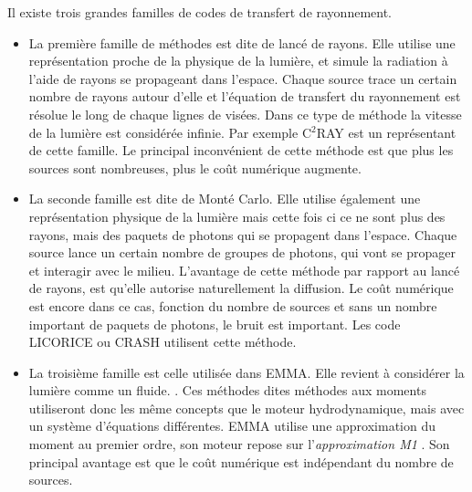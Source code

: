 Il existe trois grandes familles de codes de transfert de rayonnement.
\begin{itemize}

\item La première famille de méthodes est dite de lancé de rayons.
Elle utilise une représentation proche de la physique de la lumière, et simule la radiation à l'aide de rayons se propageant dans l'espace.
Chaque source trace un certain nombre de rayons autour d'elle et l'équation de transfert du rayonnement est résolue le long de chaque lignes de visées.
Dans ce type de méthode la vitesse de la lumière est considérée infinie.
Par exemple C$^2$RAY \citep{2006NewA...11..374M} est un représentant de cette famille.
Le principal inconvénient de cette méthode est que plus les sources sont nombreuses, plus le coût numérique augmente.

\item La seconde famille est dite de Monté Carlo.
Elle utilise également une représentation physique de la lumière mais cette fois ci ce ne sont plus des rayons, mais des paquets de photons qui se propagent dans l'espace.
Chaque source lance un certain nombre de groupes de photons, qui vont se propager et interagir avec le milieu.
L'avantage de cette méthode par rapport au lancé de rayons, est qu'elle autorise naturellement la diffusion.
Le coût numérique est encore dans ce cas, fonction du nombre de sources et sans un nombre important de paquets de photons, le bruit est important.
Les code LICORICE \citep{semelin_lyman-alpha_2007} ou CRASH \citep{2003MNRAS.345..379M} utilisent cette méthode.

\item La troisième famille est celle utilisée dans EMMA.
Elle revient à considérer la lumière comme un fluide. \citep{gnedin_multi-dimensional_2001, aubert_radiative_2008}.
Ces méthodes dites méthodes aux moments utiliseront donc les même concepts que le moteur hydrodynamique, mais avec un système d'équations différentes. 
EMMA utilise une approximation du moment au premier ordre, son moteur repose sur l'\textit{approximation M1} \citep{levermore_relating_1984}.
Son principal avantage est que le coût numérique est indépendant du nombre de sources.
\end{itemize}


